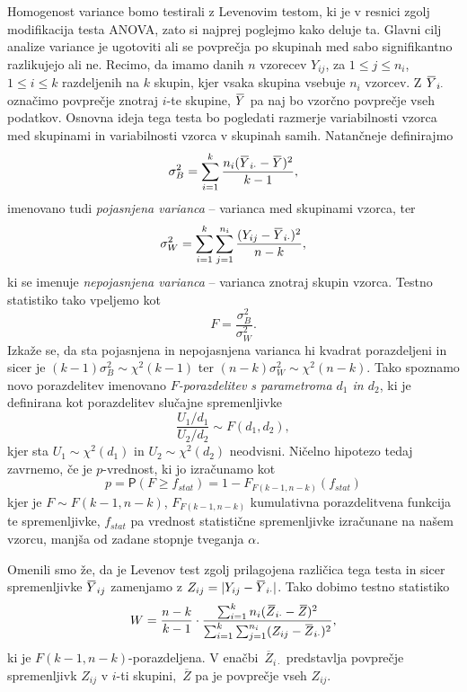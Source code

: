 \documentclass[a4paper,11pt]{article}
\newcommand{\ols}[1]{\mskip.5\thinmuskip\overline{\mskip-.5\thinmuskip {#1} \mskip-.5\thinmuskip}\mskip.5\thinmuskip} %
\newcommand{\olsi}[1]{\,\overline{\!{#1}}} %
\newcommand{\prob}{\mathsf{P}}
\begin{document}
Homogenost variance bomo testirali z Levenovim testom, ki je v resnici zgolj modifikacija testa ANOVA, zato si najprej poglejmo kako deluje ta. Glavni cilj analize variance je ugotoviti ali se povprečja po skupinah med sabo signifikantno razlikujejo ali ne. Recimo, da imamo danih $n$ vzorecev $Y_{ij}$, za $1 \leq j \leq n_i$, $1 \leq i \leq k$ razdeljenih na $k$ skupin, kjer vsaka skupina vsebuje $n_i$ vzorcev. Z $\ols{Y}_{i\cdot}$ označimo povprečje znotraj $i$-te skupine, $\ols{Y}$ pa naj bo vzorčno povprečje vseh podatkov. Osnovna ideja tega testa bo pogledati razmerje variabilnosti vzorca med skupinami in variabilnosti vzorca v skupinah samih. Natančneje definirajmo 
\[
    \sigma^2_B = \sum_{i = 1}^k \frac{n_i (\ols{Y}_{i \cdot} - \ols{Y})^2}{k-1},
\]
imenovano tudi \emph{pojasnjena varianca} -- varianca med skupinami vzorca, ter
\[
    \sigma^2_W = \sum_{i = 1}^k \sum_{j = 1}^{n_i} \frac{(Y_{ij} - \ols{Y}_{i \cdot})^2}{n - k},
\] 
ki se imenuje \emph{nepojasnjena varianca} -- varianca znotraj skupin vzorca. Testno statistiko tako vpeljemo kot
\[
    F = \frac{\sigma^2_B}{\sigma^2_W}.
\]  
Izkaže se, da sta pojasnjena in nepojasnjena varianca hi kvadrat porazdeljeni in sicer je $(k-1)\sigma^2_B \sim \chi^2(k - 1)$ ter $(n-k)\sigma^2_W \sim \chi^2(n - k)$. Tako spoznamo novo porazdelitev imenovano \emph{$F$-porazdelitev s parametroma $d_1$ in $d_2$}, ki je definirana kot porazdelitev slučajne spremenljivke
\[
    \frac{U_1/d_1}{U_2/d_2} \sim F(d_1, d_2),
\] 
kjer sta $U_1 \sim \chi^2(d_1)$ in $U_2 \sim \chi^2(d_2)$ neodvisni. Ničelno hipotezo tedaj zavrnemo, če je $p$-vrednost, ki jo izračunamo kot
\[
    p = \prob(F \geq f_{stat}) = 1 - F_{F(k-1, n - k)}(f_{stat})
\]
kjer je $F \sim F(k - 1, n - k)$, $F_{F(k-1, n - k)}$ kumulativna porazdelitvena funkcija te spremenljivke, $f_{stat}$ pa vrednost statistične spremenljivke izračunane na našem vzorcu, manjša od zadane stopnje tveganja $\alpha$.


Omenili smo že, da je Levenov test zgolj prilagojena različica tega testa in sicer spremenljivke $\ols{Y}_{ij}$ zamenjamo z $Z_{ij} = \lvert Y_{ij} - \ols{Y}_{i \cdot}\rvert$. Tako dobimo testno statistiko 
\[
    W = \frac{n - k}{k - 1} \cdot \frac{\sum_{i = 1}^k n_i (\olsi{Z}_{i \cdot} - \olsi{Z})^2}{\sum_{i = 1}^k \sum_{j = 1}^{n_i} (Z_{ij} - \ols{Z}_{i \cdot})^2},
\] 
ki je $F(k - 1, n - k)$-porazdeljena. V enačbi $\olsi{Z}_{i \cdot}$ predstavlja povprečje spremenljivk $Z_{ij}$ v $i$-ti skupini, $\olsi{Z}$ pa je povprečje vseh $Z_{ij}$.
\newline
\end{document}
